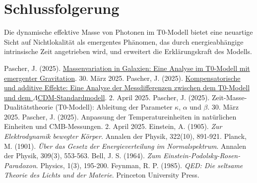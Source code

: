 \documentclass[12pt,a4paper]{article}
\begin{document}
	\section{Schlussfolgerung}
	Die dynamische effektive Masse von Photonen im T0-Modell bietet eine neuartige Sicht auf Nichtlokalität als emergentes Phänomen, das durch energieabhängige intrinsische Zeit angetrieben wird, und erweitert die Erklärungskraft des Modells.
	
	\begin{thebibliography}{9}
		 Pascher, J. (2025). \href{https://github.com/jpascher/T0-Time-Mass-Duality/tree/main/2/pdf/Deutsch/Massenvariation in Galaxien - Eine Analyse im T0-Modell mit emergenter Gravitation.pdf}{Massenvariation in Galaxien: Eine Analyse im T0-Modell mit emergenter Gravitation}. 30. März 2025.
		 Pascher, J. (2025). \href{https://github.com/jpascher/T0-Time-Mass-Duality/tree/main/2/pdf/Deutsch/Analyse der Messdifferenzen zwischen dem T0-Modell und dem Standardmodell.pdf}{Kompensatorische und additive Effekte: Eine Analyse der Messdifferenzen zwischen dem T0-Modell und dem \(\Lambda\)CDM-Standardmodell}. 2. April 2025.
		 Pascher, J. (2025). Zeit-Masse-Dualitätstheorie (T0-Modell): Ableitung der Parameter \(\kappa\), \(\alpha\) und \(\beta\). 30. März 2025.
		 Pascher, J. (2025). Anpassung der Temperatureinheiten in natürlichen Einheiten und CMB-Messungen. 2. April 2025.
		 Einstein, A. (1905). \textit{Zur Elektrodynamik bewegter Körper}. Annalen der Physik, 322(10), 891-921.
		 Planck, M. (1901). \textit{Über das Gesetz der Energieverteilung im Normalspektrum}. Annalen der Physik, 309(3), 553-563.
		 Bell, J. S. (1964). \textit{Zum Einstein-Podolsky-Rosen-Paradoxon}. Physics, 1(3), 195-200.
		 Feynman, R. P. (1985). \textit{QED: Die seltsame Theorie des Lichts und der Materie}. Princeton University Press.
	\end{thebibliography}
	
\end{document}
